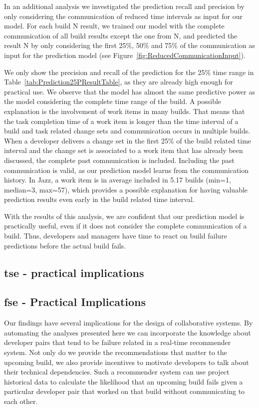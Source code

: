 In an additional analysis we investigated the prediction recall and precision by
only considering the communication of reduced time intervals as input for our
model. For each build N result, we trained our model with the complete
communication of all build results except the one from N, and predicted the
result N by only considering the first 25\%, 50\% and 75\% of the communication
as input for the prediction model (see
Figure~\ref{fig:ReducedCommunicationInput}).

We only show the precision and recall of the prediction for the 25\% time range
in Table~\ref{tab:Prediction25PResultTable}, as they are already high enough for
practical use. We observe that the model has almost the same predictive power as
the model considering the complete time range of the build. A possible
explanation is the involvement of work items in many builds. That means that the
task completion time of a work item is longer than the time interval of a build
and task related change sets and communication occurs in multiple builds. When a
developer delivers a change set in the first 25\% of the build related time
interval and the change set is associated to a work item that has already been
discussed, the complete past communication is included. Including the past
communication is valid, as our prediction model learns from the communication
history. In Jazz, a work item is in average included in 5.17 builds (min=1,
median=3, max=57), which provides a possible explanation for having valuable
prediction results even early in the build related time interval.

With the results of this analysis, we are confident that our prediction model is
practically useful, even if it does not consider the complete communication of a
build. Thus, developers and managers have time to react on build failure
predictions before the actual build fails.

\subsection{tse - practical implications}

\subsection{fse - Practical Implications}
\label{sec:implications}
Our findings have several implications for the design of collaborative systems.
By automating the analyses presented here we can incorporate the knowledge about
developer pairs that tend to be failure related in a real-time recommender
system. Not only do we provide the recommendations that matter to the upcoming
build, we also provide incentives to motivate developers to talk about their
technical dependencies. 
%
Such a recommender system can use project historical data to
calculate the likelihood that an upcoming build fails given a particular
developer pair that worked on that build without communicating to each other.


